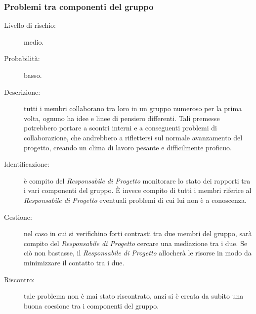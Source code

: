 \subsubsection{Problemi tra componenti del gruppo}
\begin{description}
	\item[Livello di rischio:] medio.
	\item[Probabilità:] basso.
	\item[Descrizione:] tutti i membri collaborano tra loro in un gruppo numeroso per la prima volta, ognuno ha idee e linee di pensiero differenti.
	Tali premesse potrebbero portare a scontri interni e a conseguenti problemi di collaborazione, che andrebbero a riflettersi sul normale	avanzamento del progetto, creando un clima di lavoro pesante e difficilmente proficuo.
	\item[Identificazione:] è compito del \textit{Responsabile di Progetto} monitorare lo stato dei rapporti tra i vari componenti del gruppo. È invece compito di tutti i membri riferire al \textit{Responsabile di Progetto} eventuali problemi di cui lui non è a conoscenza.
	\item[Gestione:] nel caso in cui si verifichino forti contrasti tra due membri del gruppo, sarà compito del \textit{Responsabile di Progetto} cercare una mediazione tra i due. Se ciò non bastasse, il \textit{Responsabile di Progetto} allocherà le risorse in modo da minimizzare il contatto tra i due.
	\item[Riscontro:] tale problema non è mai stato riscontrato, anzi si è creata da subito una buona coesione tra i componenti del gruppo.
\end{description}
